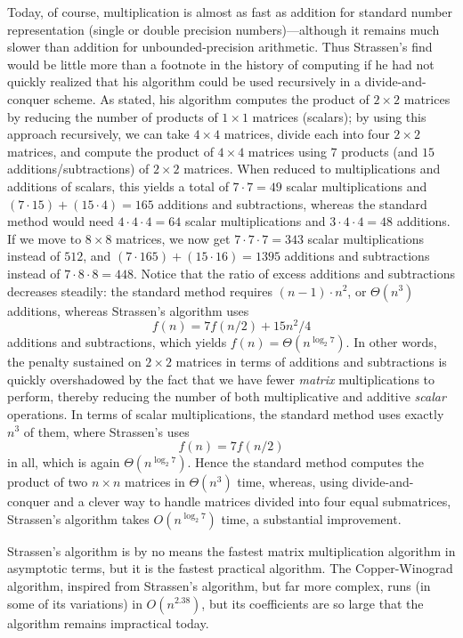 \documentclass[11pt]{article}
\begin{document}
Today, of course, multiplication is almost as fast as addition for
standard number representation (single or double precision numbers)---although
it remains much slower than addition for unbounded-precision arithmetic.
Thus Strassen's find would be little more than a footnote in the history
of computing if he had not quickly realized that his algorithm could be used
recursively in a divide-and-conquer scheme.  As stated, his algorithm computes
the product of $2\times 2$ matrices by reducing the number of products of
$1\times 1$ matrices (scalars); by using this approach recursively, we
can take $4\times 4$ matrices, divide each into four $2\times 2$ matrices,
and compute the product of $4\times 4$ matrices using $7$ products (and
$15$ additions/subtractions) of $2\times 2$ matrices.  When reduced to
multiplications and additions of scalars, this yields a total of $7\cdot7=49$
scalar multiplications and $(7\cdot 15) + (15\cdot 4) = 165$ additions
and subtractions, whereas the standard method would need $4\cdot 4\cdot 4=64$
scalar multiplications and $3\cdot 4\cdot 4=48$ additions.  If we move to
$8\times 8$ matrices, we now get $7\cdot 7\cdot 7=343$ scalar multiplications
instead of $512$, and $(7\cdot 165) + (15\cdot 16)=1395$ additions and
subtractions instead of $7\cdot 8\cdot 8=448$.  Notice that the ratio of excess
additions and subtractions decreases steadily: the standard method requires
$(n-1)\cdot n^2$, or $\Theta(n^3)$ additions, whereas Strassen's algorithm
uses
  $$f(n) = 7f(n/2) + 15n^2/4$$
additions and subtractions, which yields $f(n)=\Theta(n^{\log_2 7})$.
In other words, the penalty sustained on $2\times 2$ matrices in terms of
additions and subtractions is quickly overshadowed by the fact that we
have fewer \emph{matrix} multiplications to perform, thereby reducing the
number of both multiplicative and additive \emph{scalar} operations.
In terms of scalar multiplications, the standard method uses exactly
$n^3$ of them, where Strassen's uses
  $$f(n)=7f(n/2)$$
in all, which is again $\Theta(n^{\log_2 7})$.
Hence the standard method computes the product of two $n\times n$ matrices
in $\Theta(n^3)$ time, whereas, using divide-and-conquer and a clever way
to handle matrices divided into four equal submatrices, Strassen's algorithm
takes $O(n^{\log_2 7})$ time, a substantial improvement.

Strassen's algorithm is by no means the fastest matrix multiplication algorithm
in asymptotic terms, but it is the fastest practical algorithm.  The
Copper-Winograd algorithm, inspired from Strassen's algorithm, but
far more complex, runs (in some of its variations) in $O(n^{2.38})$, but
its coefficients are so large that the algorithm remains impractical today.
\end{document}
